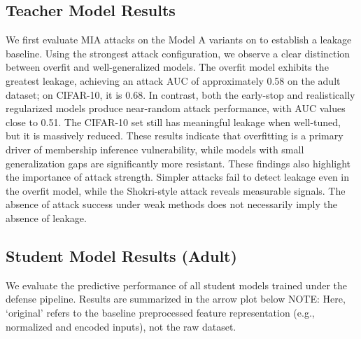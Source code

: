 \documentclass[conference]{IEEEtran}
\begin{document}
\subsection{Teacher Model Results}
We first evaluate MIA attacks on the Model A variants on to establish a leakage baseline. Using the strongest attack configuration, we observe a clear distinction between overfit and well-generalized models.
The overfit model exhibits the greatest leakage, achieving an attack AUC of approximately 0.58 on the adult dataset; on CIFAR-10, it is 0.68. In contrast, both the early-stop and realistically regularized models produce near-random attack performance, with AUC values close to 0.51. The CIFAR-10 set still has meaningful leakage when well-tuned, but it is massively reduced. These results indicate that overfitting is a primary driver of membership inference vulnerability, while models with small generalization gaps are significantly more resistant.
These findings also highlight the importance of attack strength. Simpler attacks fail to detect leakage even in the overfit model, while the Shokri-style attack reveals measurable signals. The absence of attack success under weak methods does not necessarily imply the absence of leakage.

\subsection{Student Model Results (Adult)}
We evaluate the predictive performance of all student models trained under the defense pipeline. Results are summarized in the arrow plot below
NOTE: Here, ‘original’ refers to the baseline preprocessed feature representation (e.g., normalized and encoded inputs), not the raw dataset.
\end{document}
